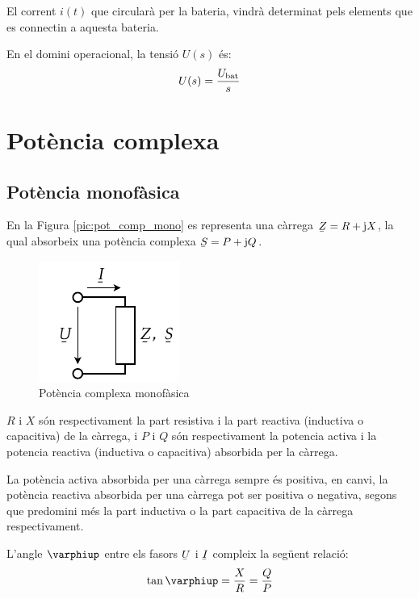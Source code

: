 El corrent $i(t)$ que circular\`{a} per la bateria, vindr\`{a} determinat
pels elements que es connectin a aquesta bateria.

 En el domini operacional, la
tensi\'{o} $U(s)$ \'{e}s:
\begin{equation}
   U(s) = \frac{U_\mathrm{bat}}{s}
\end{equation}

\section{Pot\`{e}ncia complexa}\label{sec:pot_complex} 

\subsection{Pot\`{e}ncia monof\`{a}sica} 

En la Figura \vref{pic:pot_comp_mono} es representa una c\`{a}rrega $\cmplx{Z}=R+\ju X$, la
qual absorbeix una pot\`{e}ncia complexa $\cmplx{S} = P + \ju Q$.
\begin{figure}[htb]
\centering
    \includegraphics{Imatges/Cap-Fonaments-Potencia-Monof.pdf}
\caption{Pot\`{e}ncia complexa monof\`{a}sica} \label{pic:pot_comp_mono}
\end{figure}

$R$ i $X$ s\'{o}n respectivament la part resistiva i la part reactiva
(inductiva o capacitiva) de la c\`{a}rrega, i $P$ i $Q$ s\'{o}n
respectivament la potencia activa i la potencia reactiva (inductiva
o capacitiva) absorbida per la c\`{a}rrega.

La pot\`{e}ncia activa absorbida per una c\`{a}rrega sempre \'{e}s positiva, en
canvi, la pot\`{e}ncia reactiva absorbida per una c\`{a}rrega pot ser
positiva o negativa, segons que predomini m\'{e}s la part inductiva o la
part capacitiva de la c\`{a}rrega respectivament.



L'angle $\varphiup$ entre els fasors $\cmplx{U}$ i $\cmplx{I}$ compleix la seg\"{u}ent relaci\'{o}:
\begin{equation}
   \tan\varphiup = \frac{X}{R} = \frac{Q}{P}
\end{equation}

